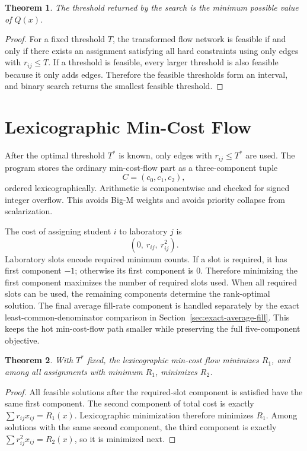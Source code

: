 \documentclass[11pt,a4paper]{article}
\newtheorem{theorem}{Theorem}
\begin{document}
\begin{theorem}
The threshold returned by the search is the minimum possible value of \(Q(x)\).
\end{theorem}

\begin{proof}
For a fixed threshold \(T\), the transformed flow network is feasible if and
only if there exists an assignment satisfying all hard constraints using only
edges with \(r_{ij}\leq T\).  If a threshold is feasible, every larger
threshold is also feasible because it only adds edges.  Therefore the feasible
thresholds form an interval, and binary search returns the smallest feasible
threshold.
\end{proof}

\section{Lexicographic Min-Cost Flow}

After the optimal threshold \(T^*\) is known, only edges with
\(r_{ij}\leq T^*\) are used.  The program stores the ordinary min-cost-flow
part as a three-component
tuple
\[
  C=(c_0,c_1,c_2),
\]
ordered lexicographically.  Arithmetic is componentwise and checked for signed
integer overflow.  This avoids Big-M weights and avoids priority collapse from
scalarization.

The cost of assigning student \(i\) to laboratory \(j\) is
\[
  (0,\ r_{ij},\ r_{ij}^2).
\]
Laboratory slots encode required minimum counts.  If a slot is required, it
has first component \(-1\); otherwise its first component is 0.  Therefore
minimizing the first component maximizes the number of required slots used.
When all required slots can be used, the remaining components determine the
rank-optimal solution.
The final average fill-rate component is handled separately by the exact
least-common-denominator comparison in Section~\ref{sec:exact-average-fill}.  This
keeps the hot min-cost-flow path smaller while preserving the full
five-component objective.

\begin{theorem}
With \(T^*\) fixed, the lexicographic min-cost flow minimizes \(R_1\), and
among all assignments with minimum \(R_1\), minimizes \(R_2\).
\end{theorem}

\begin{proof}
All feasible solutions after the required-slot component is satisfied have the
same first component.  The second component of total cost is exactly
\(\sum r_{ij}x_{ij}=R_1(x)\).  Lexicographic minimization therefore minimizes
\(R_1\).  Among solutions with the same second component, the third component
is exactly \(\sum r_{ij}^2x_{ij}=R_2(x)\), so it is minimized next.
\end{proof}
\end{document}
